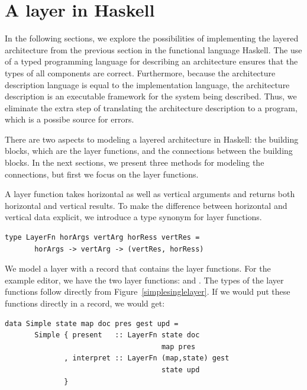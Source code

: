 \documentclass[preprint,natbib]{sigplanconf}
\begin{document}
%																
%																
%																
\section{A layer in Haskell} \label{sect:layerInHaskell}

In the following sections, we explore the possibilities of implementing the layered architecture from the previous section in the functional language Haskell. The use of a typed programming language for describing an architecture ensures that the types of all components are correct. Furthermore, because the architecture description language is equal to the implementation language, the architecture description is an executable framework for the system being described. Thus, we eliminate the extra step of translating the architecture description to a program, which is a possibe source for errors.


There are two aspects to modeling a layered architecture in Haskell: the building blocks, which are the layer functions, and the connections between the building blocks. In the next sections, we present three methods for modeling the connections, but first we focus on the layer functions. 

A layer function takes  horizontal as well as vertical arguments and returns both  horizontal and vertical results. To make the difference between horizontal and vertical data explicit, we introduce a type synonym for layer functions.



\begin{small}
\begin{verbatim}
type LayerFn horArgs vertArg horRess vertRes =
       horArgs -> vertArg -> (vertRes, horRess)
\end{verbatim}
\end{small}

We model a layer with a record that contains the layer functions. For the example editor, we have the two layer functions:  and . The types of the layer functions follow directly from Figure~\ref{simplesinglelayer}.  If we would put these functions directly in a record, we would get:

\begin{small}
\begin{verbatim}
data Simple state map doc pres gest upd =
       Simple { present   :: LayerFn state doc 
                                     map pres
              , interpret :: LayerFn (map,state) gest
                                     state upd
              }
\end{verbatim}
\end{small}
\end{document}
